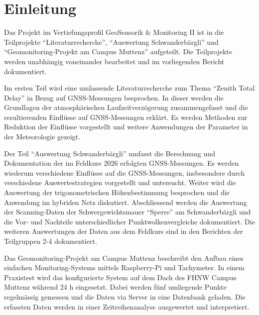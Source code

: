 \clearpage
\section{Einleitung}

Das Projekt im Vertiefungsprofil GeoSensorik \& Monitoring II ist in die Teilprojekte ``Literaturrecherche'', 
``Auswertung Schwanderbärgli'' und ``Geomonitoring-Projekt am Campus Muttenz'' aufgeteilt.
Die Teilprojekte werden unabhängig voneinander bearbeitet und im vorliegenden Bericht dokumentiert. 

Im ersten Teil wird eine umfassende Literaturrecherche zum Thema ``Zenith Total Delay'' in Bezug auf GNSS-Messungen besprochen. 
In dieser werden die Grundlagen der atmosphärischen Laufzeitverzögerung zusammengefasst und die resultierenden Einflüsse 
auf GNSS-Messungen erklärt. Es werden Methoden zur Reduktion der Einflüsse vorgestellt und weitere Anwendungen der Parameter 
in der Meteorologie gezeigt.

Der Teil ``Auswertung Schwanderbärgli'' umfasst die Berechnung und Dokumentation der im Feldkurs 2026 erfolgten GNSS-Messungen. 
Es werden wiederum verschiedene Einflüsse auf die GNSS-Messungen, insbesondere durch verschiedene Auswertestrategien vorgestellt 
und untersucht. Weiter wird die Auswertung der trigonometrischen Höhenbestimmung besprochen und die Anwendung im hybriden Netz 
diskutiert. Abschliessend werden die Auswertung der Scanning-Daten der Schwergewichtsmauer ``Sperre'' am Schwanderbärgli  
und die Vor- und Nachteile unterschiedlicher Punktwolkenvergleiche dokumentiert.
Die weiteren Auswertungen der Daten aus dem Feldkurs sind in den Berichten der Teilgruppen 2-4 dokumentiert.

Das Geomonitoring-Projekt am Campus Muttenz beschreibt den Aufbau eines
einfachen Monitoring-Systems mittels Raspberry-Pi und Tachymeter. In einem Praxistest wird das konfigurierte System auf dem 
Dach des FHNW Campus Muttenz während 24 h eingesetzt. Dabei werden fünf umliegende Punkte regelmässig gemessen und die Daten 
via Server in eine Datenbank geladen. 
Die erfassten Daten werden in einer Zeitreihenanalyse ausgewertet und interpretiert.